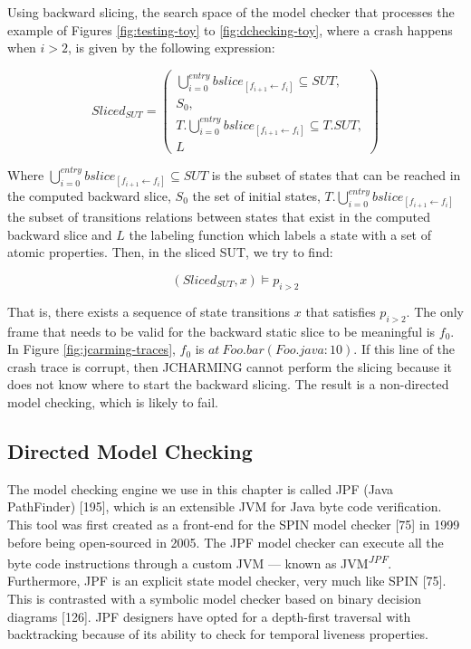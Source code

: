 \documentclass[12pt]{report}
\begin{document}
Using backward slicing, the search space of the model checker that
processes the example of Figures \ref{fig:testing-toy} to
\ref{fig:dchecking-toy}, where a crash happens when \(i>2\), is given by
the following expression:

\begin{equation}
Sliced_{SUT} =
\begin{pmatrix}
\bigcup_{i=0}^{entry} bslice_{[f_{i+1} \leftarrow f_i]} \subseteq SUT, \\
S_0, \\
T.\bigcup_{i=0}^{entry} bslice_{[f_{i+1} \leftarrow f_i]}  \subseteq T.SUT, \\
L
\end{pmatrix}
\end{equation}

Where
\(\bigcup_{i=0}^{entry} bslice_{[f_{i+1} \leftarrow f_i]} \subseteq SUT\)
is the subset of states that can be reached in the computed backward
slice, \(S_0\) the set of initial states,
\(T.\bigcup_{i=0}^{entry} bslice_{[f_{i+1} \leftarrow f_i]}\) the subset
of transitions relations between states that exist in the computed
backward slice and \(L\) the labeling function which labels a state with
a set of atomic properties. Then, in the sliced SUT, we try to find:

\begin{equation}
    (Sliced_{SUT}, x) \models p_{i>2}
\end{equation}

That is, there exists a sequence of state transitions \(x\) that
satisfies \(p_{i>2}\). The only frame that needs to be valid for the
backward static slice to be meaningful is \(f_0\). In Figure
\ref{fig:jcarming-traces}, \(f_0\) is \(at~Foo.bar(Foo.java:10)\). If
this line of the crash trace is corrupt, then JCHARMING cannot perform
the slicing because it does not know where to start the backward
slicing. The result is a non-directed model checking, which is likely to
fail.

\subsection{Directed Model Checking}\label{directed-model-checking}

The model checking engine we use in this chapter is called JPF (Java
PathFinder) {[}195{]}, which is an extensible JVM for Java byte code
verification. This tool was first created as a front-end for the SPIN
model checker {[}75{]} in 1999 before being open-sourced in 2005. The
JPF model checker can execute all the byte code instructions through a
custom JVM --- known as JVM\textsuperscript{\textit{JPF}}. Furthermore,
JPF is an explicit state model checker, very much like SPIN {[}75{]}.
This is contrasted with a symbolic model checker based on binary
decision diagrams {[}126{]}. JPF designers have opted for a depth-first
traversal with backtracking because of its ability to check for temporal
liveness properties.
\end{document}
